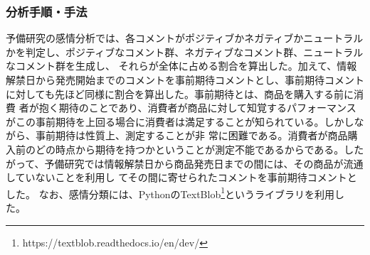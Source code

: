 \documentclass[uplatex,11pt]{jsarticle}
\begin{document}
\subsubsection{分析手順・手法}
予備研究の感情分析では、各コメントがポジティブかネガティブかニュートラルかを判定し、ポジティブなコメント群、ネガティブなコメント群、ニュートラルなコメント群を生成し、
それらが全体に占める割合を算出した。加えて、情報解禁日から発売開始までのコメントを事前期待コメントとし、事前期待コメントに対しても先ほど同様に割合を算出した。事前期待とは、商品を購入する前に消費
者が抱く期待のことであり、消費者が商品に対して知覚するパフォーマンスがこの事前期待を上回る場合に消費者は満足することが知られている。\cite{コトラー}しかしながら、事前期待は性質上、測定することが非
常に困難である。消費者が商品購入前のどの時点から期待を持つかということが測定不能であるからである。したがって、予備研究では情報解禁日から商品発売日までの間には、その商品が流通していないことを利用し
てその間に寄せられたコメントを事前期待コメントとした。
なお、感情分類には、PythonのTextBlob\footnote{https://textblob.readthedocs.io/en/dev/}というライブラリを利用した。
\end{document}
